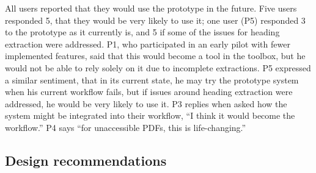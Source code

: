 All users reported that they would use the prototype in the future.
Five users responded 5, that they would be very likely to use it; one user (P5) responded 3 to the prototype as it currently is, and 5 if some of the issues for heading extraction were addressed. P1, who participated in an early pilot with fewer implemented features, said that this would become a tool in the toolbox, but he would not be able to rely solely on it due to incomplete extractions. P5 expressed a similar sentiment, that in its current state, he may try the prototype system when his current workflow fails, but if issues around heading extraction were addressed, he would be very likely to use it. P3 replies when asked how the system might be integrated into their workflow, ``I think it would become the workflow.'' P4 says ``for unaccessible PDFs, this is life-changing.''


\subsection{Design recommendations}
\label{sec:designrecs}

